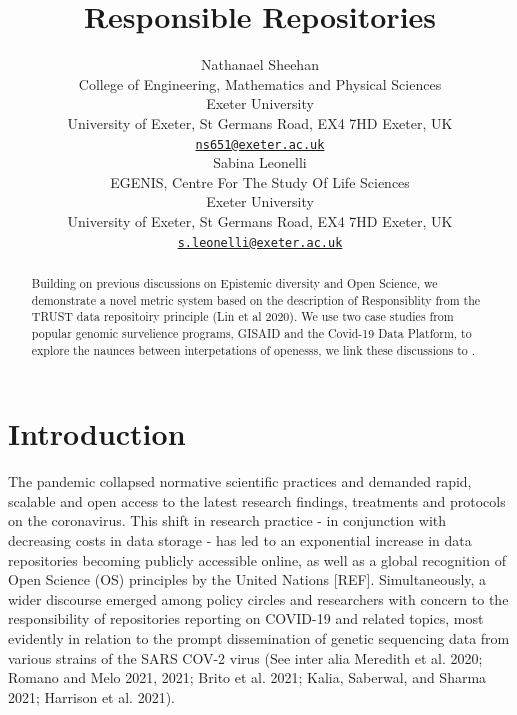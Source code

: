 \documentclass{article}
\title{Responsible Repositories}
\author{
    Nathanael Sheehan
   \\
    College of Engineering, Mathematics and Physical Sciences \\
    Exeter University \\
  University of Exeter, St Germans Road, EX4 7HD Exeter, UK \\
  \texttt{\href{mailto:ns651@exeter.ac.uk}{\nolinkurl{ns651@exeter.ac.uk}}} \\
   \And
    Sabina Leonelli
   \\
    EGENIS, Centre For The Study Of Life Sciences \\
    Exeter University \\
  University of Exeter, St Germans Road, EX4 7HD Exeter, UK \\
  \texttt{\href{mailto:s.leonelli@exeter.ac.uk}{\nolinkurl{s.leonelli@exeter.ac.uk}}} \\
  }
\begin{document}
\maketitle


\begin{abstract}
Building on previous discussions on Epistemic diversity and Open
Science, we demonstrate a novel metric system based on the description
of Responsiblity from the TRUST data repositoiry principle (Lin et al
2020). We use two case studies from popular genomic survelience
programs, GISAID and the Covid-19 Data Platform, to explore the naunces
between interpetations of openesss, we link these discussions to .
\end{abstract}


\newpage

\hypertarget{introduction}{%
\section{Introduction}\label{introduction}}

The pandemic collapsed normative scientific practices and demanded
rapid, scalable and open access to the latest research findings,
treatments and protocols on the coronavirus. This shift in research
practice - in conjunction with decreasing costs in data storage - has
led to an exponential increase in data repositories becoming publicly
accessible online, as well as a global recognition of Open Science (OS)
principles by the United Nations {[}REF{]}. Simultaneously, a wider
discourse emerged among policy circles and researchers with concern to
the responsibility of repositories reporting on COVID-19 and related
topics, most evidently in relation to the prompt dissemination of
genetic sequencing data from various strains of the SARS COV-2 virus
(See inter alia Meredith et al. 2020; Romano and Melo 2021, 2021; Brito
et al. 2021; Kalia, Saberwal, and Sharma 2021; Harrison et al. 2021).
\end{document}
